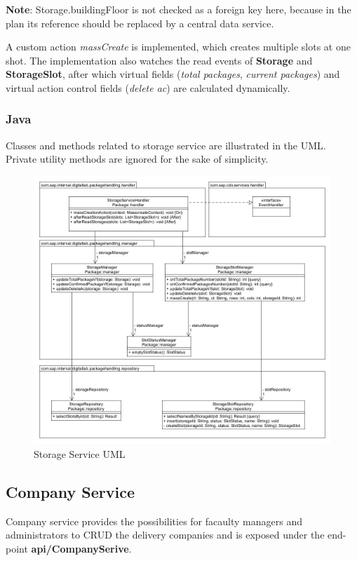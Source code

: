 \bigskip
\textbf{Note}: Storage.buildingFloor is not checked as a foreign key here, because in the plan its reference should be replaced by a central data service.


A custom action \textit{massCreate} is implemented, which creates multiple slots at one shot. The implementation also watches the read events of \textbf{Storage} and \textbf{StorageSlot}, after which virtual fields (\textit{total packages}, \textit{current packages}) and virtual action control fields (\textit{delete ac}) are calculated dynamically.

\subsubsection{Java}

Classes and methods related to storage service are illustrated in the UML. Private utility methods are ignored for the sake of simplicity.
\begin{figure}[!h]
    \centering
    \includegraphics[width=1\linewidth]{images/service_class_diagrams/storage_service_class_diagram.png}
    \caption{Storage Service UML}
    \label{fig:storage_service_uml}
\end{figure}
\pagebreak

\subsection{Company Service}
Company service provides the possibilities for facaulty managers and administrators to CRUD the delivery companies and is exposed under the end-point \textbf{api/CompanySerive}.

